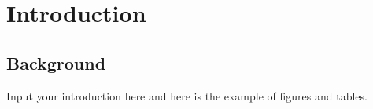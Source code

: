 \chapter{Introduction}

\section{Background}

Input your introduction here and here is the example of figures and tables.



